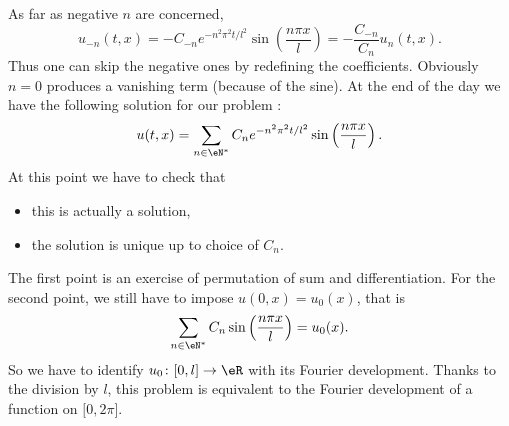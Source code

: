 As far as negative \( n\) are concerned,
\begin{equation}
    u_{-n}(t,x)=-C_{-n} e^{-n^2\pi^2 t/l^2}\sin\left( \frac{ n\pi x }{ l } \right)=-\frac{ C_{-n} }{C_n  }u_n(t,x).
\end{equation}
Thus one can skip the negative ones by redefining the coefficients. Obviously \( n=0\) produces a vanishing term (because of the sine). At the end of the day we have the following solution for our problem :
\begin{equation}
    u(t,x)=\sum_{n\in \eN^*}C_n e^{-n^2\pi^2 t/l^2}\sin\left( \frac{ n\pi x }{ l } \right).
\end{equation}
At this point we have to check that
\begin{itemize}
    \item this is actually a solution,
    \item the solution is unique up to choice of \( C_n\).
\end{itemize}
The first point is an exercise of permutation of sum and differentiation. For the second point, we still have to impose \( u(0,x)=u_0(x)\), that is
\begin{equation}
    \sum_{n\in \eN^*}C_n\sin\left( \frac{ n\pi x }{ l } \right)=u_0(x).
\end{equation}
So we have to identify \( u_0\colon  \mathopen[ 0 , l \mathclose]\to \eR \) with its Fourier development. Thanks to the division by \( l\), this problem is equivalent to the Fourier development of a function on \( \mathopen[ 0 , 2\pi \mathclose]\).

